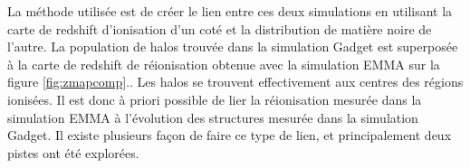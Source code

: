 
La méthode utilisée est de créer le lien entre ces deux simulations en utilisant la carte de redshift d'ionisation d'un coté et la distribution de matière noire de l'autre.
La population de halos trouvée dans la simulation Gadget est superposée à la carte de redshift de réionisation obtenue avec la simulation EMMA sur la figure \ref{fig:zmapcomp}..
Les halos se trouvent effectivement aux centres des régions ionisées.
Il est donc à priori possible de lier la réionisation mesurée dans la simulation EMMA à l'évolution des structures mesurée dans la simulation Gadget.
Il existe plusieurs façon de faire ce type de lien, et principalement deux pistes ont été explorées.


